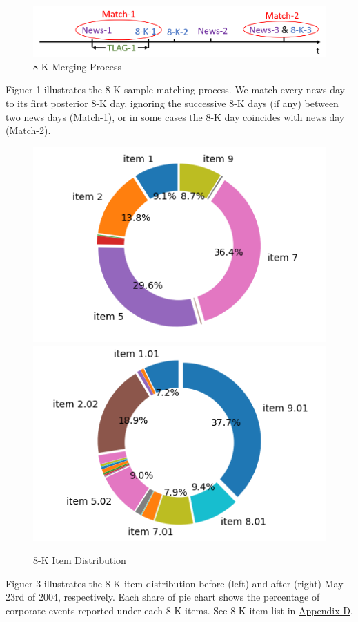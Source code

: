 \begin{figure}
	\caption{8-K Merging Process} \label{fig1}
	\begin{center}
		\includegraphics[scale=0.6]{../output/fig/fig1_matching.png}
	\end{center}
\end{figure}

Figuer 1 illustrates the 8-K sample matching process. We match every news day to its first posterior 8-K day, ignoring the successive 8-K days (if any) between two news days (Match-1), or in some cases the 8-K day coincides with news day (Match-2).

 \label{fig2}

\setcounter{figure}{2}
\begin{figure}[htbp]
	\begin{center}
		\caption{8-K Item Distribution} \label{fig3}
		\includegraphics[scale=0.5]{../output/fig/fig3_8-K_before.png}
		\includegraphics[scale=0.5]{../output/fig/fig3_8-K_after.png}
	\end{center}
\end{figure}

Figuer 3 illustrates the 8-K item distribution before (left) and after (right) May 23rd of 2004, respectively. Each share of pie chart shows the percentage of corporate events reported under each 8-K items. See 8-K item list in \hyperref[appd]{Appendix D}.